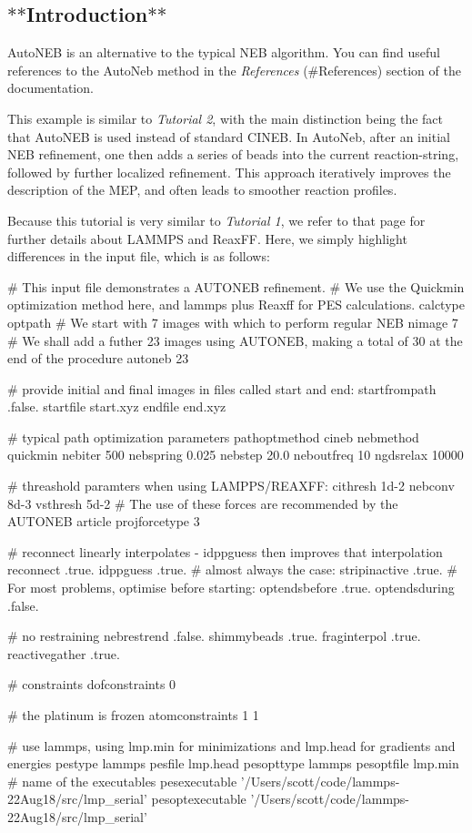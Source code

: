 \subsection*{$\ast$$\ast$\+Introduction$\ast$$\ast$}

Auto\+N\+EB is an alternative to the typical N\+EB algorithm. You can find useful references to the Auto\+Neb method in the {\itshape References} (\#\+References) section of the documentation.

This example is similar to {\itshape Tutorial 2}, with the main distinction being the fact that Auto\+N\+EB is used instead of standard C\+I\+N\+EB. In Auto\+Neb, after an initial N\+EB refinement, one then adds a series of beads into the current reaction-\/string, followed by further localized refinement. This approach iteratively improves the description of the M\+EP, and often leads to smoother reaction profiles.

Because this tutorial is very similar to {\itshape Tutorial 1}, we refer to that page for further details about L\+A\+M\+M\+PS and Reax\+FF. Here, we simply highlight differences in the input file, which is as follows\+: \begin{DoxyVerb}# This input file demonstrates a AUTONEB refinement.
# We use the Quickmin optimization method here, and lammps plus Reaxff for PES calculations.
calctype optpath
# We start with 7 images with which to perform regular NEB
nimage 7
# We shall add a futher 23 images using AUTONEB, making a total of 30 at the end of the procedure
autoneb 23

# provide initial and final images in files called start and end:
startfrompath  .false.
startfile start.xyz
endfile end.xyz

# typical path optimization parameters
pathoptmethod cineb
nebmethod     quickmin
nebiter       500
nebspring     0.025
nebstep       20.0
neboutfreq    10
ngdsrelax     10000

# threashold paramters when using LAMPPS/REAXFF:
cithresh      1d-2
nebconv       8d-3
vsthresh      5d-2
# The use of these forces are recommended by the AUTONEB article
projforcetype 3

# reconnect linearly interpolates - idppguess then improves that interpolation
reconnect      .true.
idppguess      .true.
# almost always the case:
stripinactive  .true.
# For most problems, optimise before starting:
optendsbefore  .true.
optendsduring  .false.

# no restraining
nebrestrend    .false.
shimmybeads    .true.
fraginterpol   .true.
reactivegather .true.

# constraints
dofconstraints 0

# the platinum is frozen
atomconstraints 1
1

# use lammps, using lmp.min for minimizations and lmp.head for gradients and energies
pestype  lammps
pesfile   lmp.head
pesopttype  lammps
pesoptfile lmp.min
# name of the executables
pesexecutable '/Users/scott/code/lammps-22Aug18/src/lmp_serial'
pesoptexecutable '/Users/scott/code/lammps-22Aug18/src/lmp_serial'\end{DoxyVerb}
 